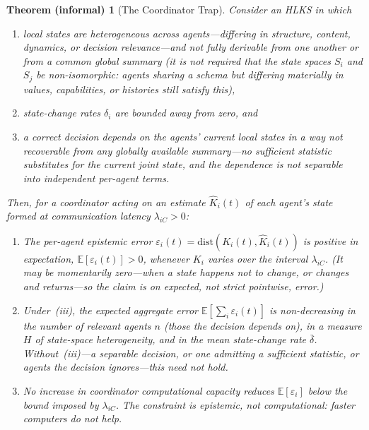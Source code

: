 \documentclass[11pt]{article}
\theoremstyle{definition}
\theoremstyle{plain}
\newtheorem*{informaltheorem}{Theorem (informal)}
\theoremstyle{plain}
\begin{document}
\begin{informaltheorem}[The Coordinator Trap]\label{thm:coordtrap}
Consider an HLKS in which
\begin{enumerate}[label=(\roman*)]
\item local states are heterogeneous across agents---differing in structure,
  content, dynamics, or decision relevance---and not fully derivable from one another
  or from a common global summary (it is \emph{not} required that the state spaces
  $S_i$ and $S_j$ be non-isomorphic: agents sharing a schema but differing materially
  in values, capabilities, or histories still satisfy this),
\item state-change rates $\delta_i$ are bounded away from zero, and
\item a correct decision depends on the agents' current local states in a way not
  recoverable from any globally available summary---no sufficient statistic
  substitutes for the current joint state, and the dependence is not separable into
  independent per-agent terms.
\end{enumerate}
Then, for a coordinator acting on an estimate $\hat{K}_i(t)$ of each agent's state
formed at communication latency $\lambda_{iC} > 0$:
\begin{enumerate}
\item The per-agent epistemic error
  $\varepsilon_i(t) = \mathrm{dist}(K_i(t), \hat{K}_i(t))$ is positive \emph{in
  expectation}, $\mathbb{E}[\varepsilon_i(t)] > 0$, whenever $K_i$ varies over the
  interval $\lambda_{iC}$. (It may be momentarily zero---when a state happens not to
  change, or changes and returns---so the claim is on expected, not strict
  pointwise, error.)
\item Under~(iii), the expected aggregate error
  $\mathbb{E}\!\left[\sum_i \varepsilon_i(t)\right]$ is non-decreasing in the number
  of \emph{relevant} agents $n$ (those the decision depends on), in a measure $H$ of
  state-space heterogeneity, and in the mean state-change rate $\bar{\delta}$.
  Without~(iii)---a separable decision, or one admitting a sufficient statistic, or
  agents the decision ignores---this need not hold.
\item No increase in coordinator computational capacity reduces
  $\mathbb{E}[\varepsilon_i]$ below the bound imposed by $\lambda_{iC}$. The
  constraint is epistemic, not computational: faster computers do not help.
\end{enumerate}
\end{informaltheorem}
\end{document}
